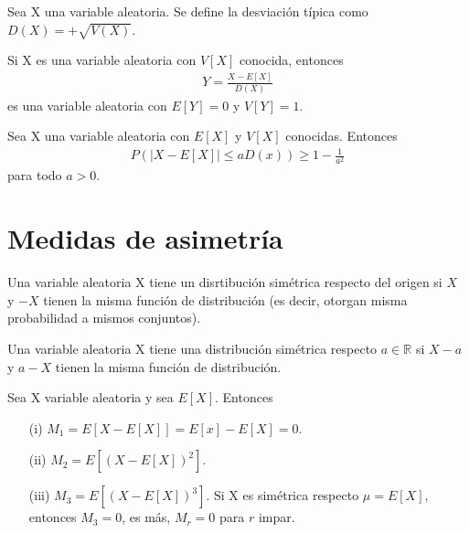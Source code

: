 \begin{defi}
    Sea X una variable aleatoria. Se define la desviación típica como $D(X) = +\sqrt{V(X)}$.
\end{defi}

\begin{obs}
    Si X es una variable aleatoria con $V[X]$ conocida, entonces
    \begin{align*}
        Y = \frac{X - E[X]}{D(X)}
    \end{align*}
    es una variable aleatoria con $E[Y] = 0$ y $V[Y] = 1$.
\end{obs}

\begin{teo}
    Sea X una variable aleatoria con $E[X]$ y $V[X]$ conocidas. Entonces
    \begin{align*}
        P(|X - E[X]| \leq aD(x)) \ge 1 - \frac{1}{a^2}
    \end{align*}
    para todo $a > 0$.
\end{teo}

\section{Medidas de asimetría}

\begin{defi}
    Una variable aleatoria X tiene un disrtibución simétrica respecto del origen si $X$ y $-X$ tienen la misma función de distribución (es decir, otorgan misma probabilidad a mismos conjuntos).
\end{defi}

\begin{defi}
    Una variable aleatoria X tiene una distribución simétrica respecto $a \in \mathbb{R}$ si $X - a$ y $a - X$ tienen la misma función de distribución.
\end{defi}

\begin{obs}
    Sea X variable aleatoria y sea $E[X]$. Entonces
    \begin{enumerate}
        \item[(i)] $M_1 = E[X - E[X]] = E[x] - E[X] = 0$.
        \item[(ii)] $M_2 = E[(X - E[X])^2]$.
        \item[(iii)] $M_3 = E[(X - E[X])^3]$. Si X es simétrica respecto $\mu = E[X]$, entonces $M_3 = 0$, es más, $M_r = 0$ para $r$ impar.
    \end{enumerate}
\end{obs}

